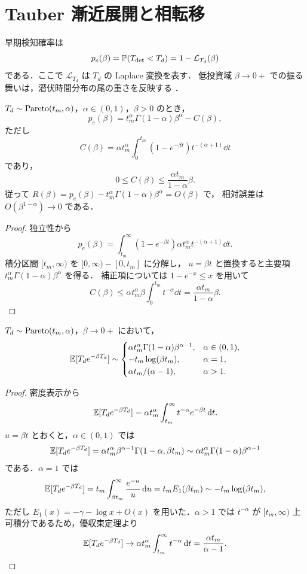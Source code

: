 \section{Tauber 漸近展開と相転移}

早期検知確率は
\[
  p_e(\beta)=\mathbb{P}(T_{\mathrm{det}}<T_d)=1-\mathcal{L}_{T_d}(\beta)
\]
である．ここで $\mathcal{L}_{T_d}$ は $T_d$ の Laplace 変換を表す．
低投資域 $\beta\to0+$ での振る舞いは，潜伏時間分布の尾の重さを反映する
\cite{feller1971,bingham1989,resnick2007}．

\begin{theorem}
$T_d\sim\mathrm{Pareto}(t_m,\alpha)$，$\alpha\in(0,1)$，$\beta>0$ のとき，
\begin{equation}
  p_e(\beta)=t_m^\alpha\Gamma(1-\alpha)\beta^\alpha-C(\beta),
  \label{eq:tauber}
\end{equation}
ただし
\[
  C(\beta)=\alpha t_m^\alpha\int_0^{t_m}(1-e^{-\beta t})t^{-(\alpha+1)}\dd t
\]
であり，
\begin{equation}
  0\le C(\beta)\le \frac{\alpha t_m}{1-\alpha}\beta .
  \label{eq:tauber-bound}
\end{equation}
従って $R(\beta)=p_e(\beta)-t_m^\alpha\Gamma(1-\alpha)\beta^\alpha=O(\beta)$ で，
相対誤差は $O(\beta^{1-\alpha})\to0$ である．
\end{theorem}

\begin{proof}
独立性から
\[
  p_e(\beta)=\int_{t_m}^{\infty}(1-e^{-\beta t})
  \alpha t_m^\alpha t^{-(\alpha+1)}\dd t .
\]
積分区間 $[t_m,\infty)$ を $[0,\infty)-[0,t_m]$ に分解し，
$u=\beta t$ と置換すると主要項
$t_m^\alpha\Gamma(1-\alpha)\beta^\alpha$ を得る．
補正項については $1-e^{-x}\le x$ を用いて
\[
  C(\beta)\le \alpha t_m^\alpha\beta\int_0^{t_m}t^{-\alpha}\dd t
  =\frac{\alpha t_m}{1-\alpha}\beta .
\]
\end{proof}

\begin{lemma}
$T_d\sim\mathrm{Pareto}(t_m,\alpha)$，$\beta\to0+$ において，
\[
\mathbb{E}[T_de^{-\beta T_d}]
\sim
\begin{cases}
\alpha t_m^\alpha\Gamma(1-\alpha)\beta^{\alpha-1}, & \alpha\in(0,1),\\
-t_m\log(\beta t_m), & \alpha=1,\\
\alpha t_m/(\alpha-1), & \alpha>1.
\end{cases}
\]
\end{lemma}

\begin{proof}
密度表示から
\[
  \mathbb{E}[T_de^{-\beta T_d}]
  =\alpha t_m^\alpha\int_{t_m}^{\infty}t^{-\alpha}e^{-\beta t}\,\mathrm{d} t .
\]
$u=\beta t$ とおくと，$\alpha\in(0,1)$ では
\[
  \mathbb{E}[T_de^{-\beta T_d}]
  =\alpha t_m^\alpha\beta^{\alpha-1}
  \Gamma(1-\alpha,\beta t_m)
  \sim \alpha t_m^\alpha\Gamma(1-\alpha)\beta^{\alpha-1}
\]
である．$\alpha=1$ では
\[
  \mathbb{E}[T_de^{-\beta T_d}]
  =t_m\int_{\beta t_m}^{\infty}\frac{e^{-u}}{u}\,\mathrm{d} u
  =t_m E_1(\beta t_m)
  \sim -t_m\log(\beta t_m),
\]
ただし $E_1(x)=-\gamma-\log x+O(x)$ を用いた．$\alpha>1$ では
$t^{-\alpha}$ が $[t_m,\infty)$ 上可積分であるため，優収束定理より
\[
  \mathbb{E}[T_de^{-\beta T_d}]
  \to\alpha t_m^\alpha\int_{t_m}^{\infty}t^{-\alpha}\,\mathrm{d} t
  =\frac{\alpha t_m}{\alpha-1}.
\]
\end{proof}

